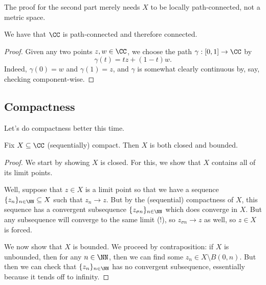 \begin{remark}
	The proof for the second part merely needs $X$ to be locally path-connected, not a metric space.
\end{remark}
\begin{corollary} \label{cor:cconnected}
	We have that $\CC$ is path-connected and therefore connected.
\end{corollary}
\begin{proof}
	Given any two points $z,w\in\CC$, we choose the path $\gamma:[0,1]\to\CC$ by
	\[\gamma(t)=tz+(1-t)w.\]
	Indeed, $\gamma(0)=w$ and $\gamma(1)=z$, and $\gamma$ is somewhat clearly continuous by, say, checking component-wise.
\end{proof}

\subsection{Compactness}
Let's do compactness better this time.
\begin{lemma}
	Fix $X\subseteq\CC$ (sequentially) compact. Then $X$ is both closed and bounded.
\end{lemma}
\begin{proof}
	We start by showing $X$ is closed. For this, we show that $X$ contains all of its limit points.
	
	Well, suppose that $z\in X$ is a limit point so that we have a sequence $\{z_n\}_{n\in\NN}\subseteq X$ such that $z_n\to z$. But by the (sequential) compactness of $X$, this sequence has a convergent subsequence $\{z_{\sigma n}\}_{n\in\NN}$ which does converge in $X$. But any subsequence will converge to the same limit (!), so $z_{\sigma n}\to z$ as well, so $z\in X$ is forced.

	We now show that $X$ is bounded. We proceed by contraposition: if $X$ is unbounded, then for any $n\in\NN$, then we can find some $z_n\in X\setminus B(0,n)$. But then we can check that $\{z_n\}_{n\in\NN}$ has no convergent subsequence, essentially because it tends off to infinity.
\end{proof}

